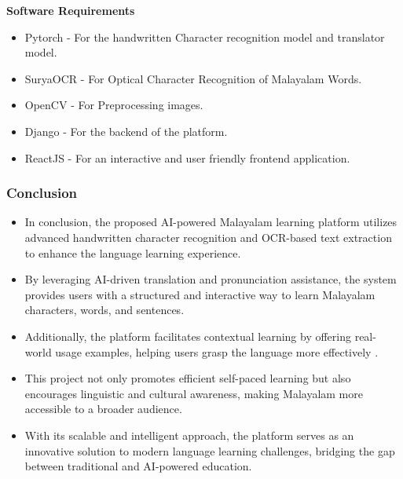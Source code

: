 \documentclass[aspectratio=169]{beamer}
\begin{document}
\begin{frame}
    \item \textbf{Software Requirements}     
        \begin{itemize}
            \item Pytorch - For the handwritten Character recognition model and translator model. 
            \item SuryaOCR - For Optical Character Recognition of Malayalam Words. 
            \item OpenCV - For Preprocessing images. 
            \item Django - For the backend of the platform.
            \item ReactJS - For an interactive and user friendly frontend application.
        \end{itemize}
\end{frame}

\begin{frame}
    \frametitle{Conclusion}
    \begin{itemize}
       \item In conclusion, the proposed AI-powered Malayalam learning platform utilizes advanced handwritten character recognition and OCR-based text extraction to enhance the language learning experience.
       \item By leveraging AI-driven translation and pronunciation assistance, the system provides users with a structured and interactive way to learn Malayalam characters, words, and sentences.
       \item Additionally, the platform facilitates contextual learning by offering real-world usage examples, helping users grasp the language more effectively .
       \item This project not only promotes efficient self-paced learning but also encourages linguistic and cultural awareness, making Malayalam more accessible to a broader audience.
       \item With its scalable and intelligent approach, the platform serves as an innovative solution to modern language learning challenges, bridging the gap between traditional and AI-powered education.
       
    \end{itemize}
\end{frame}
\end{document}
